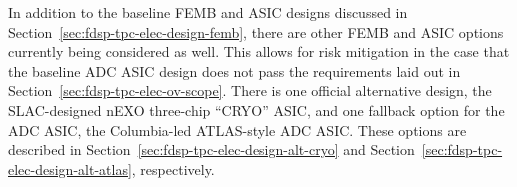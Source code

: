 In addition to the baseline FEMB and ASIC designs discussed in Section~\ref{sec:fdsp-tpc-elec-design-femb}, there are other FEMB and ASIC options currently being considered as well.  This allows for risk mitigation in the case that the baseline ADC ASIC design does not pass the requirements laid out in Section~\ref{sec:fdsp-tpc-elec-ov-scope}.  There is one official alternative design, the SLAC-designed nEXO three-chip ``CRYO'' ASIC, and one fallback option for the ADC ASIC, the Columbia-led ATLAS-style ADC ASIC.  These options are described in Section~\ref{sec:fdsp-tpc-elec-design-alt-cryo} and Section~\ref{sec:fdsp-tpc-elec-design-alt-atlas}, respectively.
